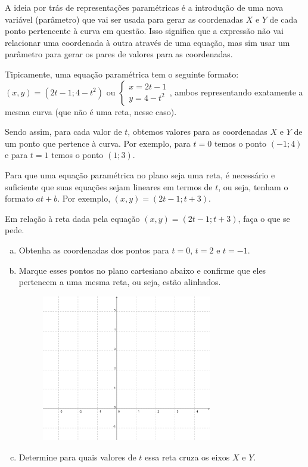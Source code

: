 \documentclass[main_estudante.tex]{subfiles}
\begin{document}
A ideia por trás de representações paramétricas é a introdução de uma nova variável (parâmetro) que vai ser usada para gerar as coordenadas $X$ e $Y$ de cada ponto pertencente à curva em questão. Isso significa que a expressão não vai relacionar uma coordenada à outra através de uma equação, mas sim usar um parâmetro para gerar os pares de valores para as coordenadas.

Tipicamente, uma equação paramétrica tem o seguinte formato: $(x,y)=(2t-1;4-t^2)$ ou $\begin{cases} x=2t-1 \\ y=4-t^2 \end{cases}$, ambos representando exatamente a mesma curva (que não é uma reta, nesse caso).

Sendo assim, para cada valor de $t$, obtemos valores para as coordenadas $X$ e $Y$ de um ponto que pertence à curva. Por exemplo, para $t=0$ temos o ponto $(-1;4)$ e para $t=1$ temos o ponto $(1;3)$.

Para que uma equação paramétrica no plano seja uma reta, é necessário e suficiente que suas equações sejam lineares em termos de $t$, ou seja, tenham o formato $at+b$. Por exemplo, $(x,y)=(2t-1;t+3)$.

\begin{questao}
Em relação à reta dada pela equação $(x,y)=(2t-1;t+3)$, faça o que se pede.
\begin{enumerate}[a)]
\item Obtenha as coordenadas dos pontos para $t=0$, $t=2$ e $t=-1$.
\item Marque esses pontos no plano cartesiano abaixo e confirme que eles pertencem a uma mesma reta, ou seja, estão alinhados.

\begin{figure}[h]
\centering
\includegraphics[width=0.7\textwidth]{./img/c6q10.png}
\end{figure}

\item Determine para quais valores de $t$ essa reta cruza os eixos $X$ e $Y$.
\end{enumerate} 
\end{questao}
\end{document}
